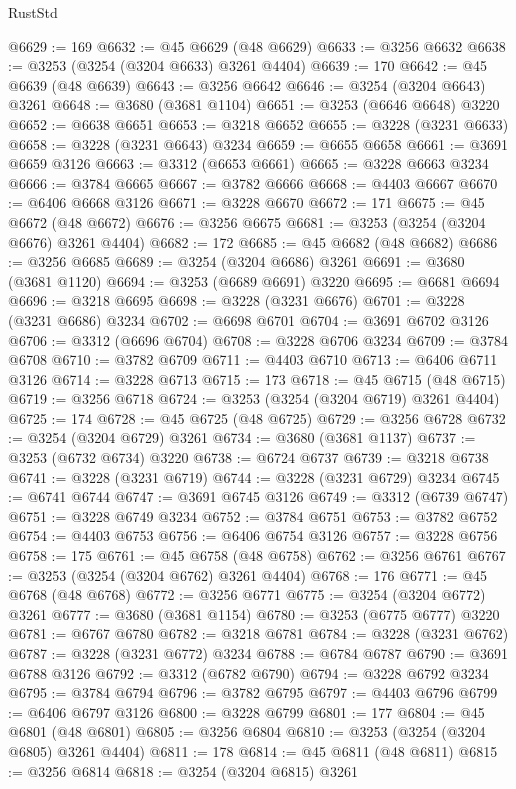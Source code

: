 \begin{lexlean}{RustStd}
\begin{coremodule}
@6629 := 169
@6632 := @45 @6629 (@48 @6629)
@6633 := @3256 @6632
@6638 := @3253 (@3254 (@3204 @6633) @3261 @4404)
@6639 := 170
@6642 := @45 @6639 (@48 @6639)
@6643 := @3256 @6642
@6646 := @3254 (@3204 @6643) @3261
@6648 := @3680 (@3681 @1104)
@6651 := @3253 (@6646 @6648) @3220
@6652 := @6638 @6651
@6653 := @3218 @6652
@6655 := @3228 (@3231 @6633)
@6658 := @3228 (@3231 @6643) @3234
@6659 := @6655 @6658
@6661 := @3691 @6659 @3126
@6663 := @3312 (@6653 @6661)
@6665 := @3228 @6663 @3234
@6666 := @3784 @6665
@6667 := @3782 @6666
@6668 := @4403 @6667
@6670 := @6406 @6668 @3126
@6671 := @3228 @6670
@6672 := 171
@6675 := @45 @6672 (@48 @6672)
@6676 := @3256 @6675
@6681 := @3253 (@3254 (@3204 @6676) @3261 @4404)
@6682 := 172
@6685 := @45 @6682 (@48 @6682)
@6686 := @3256 @6685
@6689 := @3254 (@3204 @6686) @3261
@6691 := @3680 (@3681 @1120)
@6694 := @3253 (@6689 @6691) @3220
@6695 := @6681 @6694
@6696 := @3218 @6695
@6698 := @3228 (@3231 @6676)
@6701 := @3228 (@3231 @6686) @3234
@6702 := @6698 @6701
@6704 := @3691 @6702 @3126
@6706 := @3312 (@6696 @6704)
@6708 := @3228 @6706 @3234
@6709 := @3784 @6708
@6710 := @3782 @6709
@6711 := @4403 @6710
@6713 := @6406 @6711 @3126
@6714 := @3228 @6713
@6715 := 173
@6718 := @45 @6715 (@48 @6715)
@6719 := @3256 @6718
@6724 := @3253 (@3254 (@3204 @6719) @3261 @4404)
@6725 := 174
@6728 := @45 @6725 (@48 @6725)
@6729 := @3256 @6728
@6732 := @3254 (@3204 @6729) @3261
@6734 := @3680 (@3681 @1137)
@6737 := @3253 (@6732 @6734) @3220
@6738 := @6724 @6737
@6739 := @3218 @6738
@6741 := @3228 (@3231 @6719)
@6744 := @3228 (@3231 @6729) @3234
@6745 := @6741 @6744
@6747 := @3691 @6745 @3126
@6749 := @3312 (@6739 @6747)
@6751 := @3228 @6749 @3234
@6752 := @3784 @6751
@6753 := @3782 @6752
@6754 := @4403 @6753
@6756 := @6406 @6754 @3126
@6757 := @3228 @6756
@6758 := 175
@6761 := @45 @6758 (@48 @6758)
@6762 := @3256 @6761
@6767 := @3253 (@3254 (@3204 @6762) @3261 @4404)
@6768 := 176
@6771 := @45 @6768 (@48 @6768)
@6772 := @3256 @6771
@6775 := @3254 (@3204 @6772) @3261
@6777 := @3680 (@3681 @1154)
@6780 := @3253 (@6775 @6777) @3220
@6781 := @6767 @6780
@6782 := @3218 @6781
@6784 := @3228 (@3231 @6762)
@6787 := @3228 (@3231 @6772) @3234
@6788 := @6784 @6787
@6790 := @3691 @6788 @3126
@6792 := @3312 (@6782 @6790)
@6794 := @3228 @6792 @3234
@6795 := @3784 @6794
@6796 := @3782 @6795
@6797 := @4403 @6796
@6799 := @6406 @6797 @3126
@6800 := @3228 @6799
@6801 := 177
@6804 := @45 @6801 (@48 @6801)
@6805 := @3256 @6804
@6810 := @3253 (@3254 (@3204 @6805) @3261 @4404)
@6811 := 178
@6814 := @45 @6811 (@48 @6811)
@6815 := @3256 @6814
@6818 := @3254 (@3204 @6815) @3261

\end{coremodule}
\end{lexlean}
